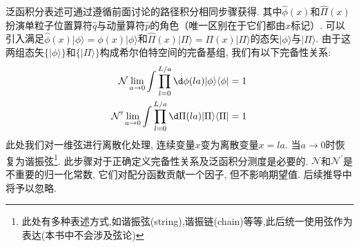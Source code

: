 泛函积分表述可通过遵循前面讨论的路径积分相同步骤获得. 其中$\hat{\phi}(x)$和$\hat{\Pi}(x)$扮演单粒子位置算符$\hat{q}$与动量算符$\hat{p}$的角色（唯一区别在于它们都由$x$标记）. 可以引入满足$\hat{\phi}(x)|\phi\rangle=\phi(x)|\phi\rangle$和$\hat{\Pi}(x)|\Pi\rangle=\Pi(x)|\Pi\rangle$的态矢$|\phi\rangle$与$|\Pi\rangle$. 由于这两组态矢$\{|\phi\rangle\}$和$\{|\Pi\rangle\}$构成希尔伯特空间的完备基组, 我们有以下完备性关系:
\begin{equation}
	\begin{aligned}\mathcal{N}\lim_{a\to0}\int\prod_{l=0}^{L/a}\d\phi(la)|\phi\rangle\langle\phi|&=1\\\mathcal{N}^{\prime}\lim_{a\to0}\int\prod_{l=0}^{L/a}\d\Pi(la)|\Pi\rangle\langle\Pi|&=1\end{aligned}
\end{equation}
此处我们对一维弦进行离散化处理, 连续变量$x$变为离散变量$x=la$. 当$a\to0$时恢复为谐振弦\footnote{此处有多种表述方式,如谐振弦(string),谐振链(chain)等等,此后统一使用弦作为表达(本书中不会涉及弦论)}. 此步骤对于正确定义完备性关系及泛函积分测度是必要的. $\mathcal{N}$和$\mathcal{N}^\prime$是不重要的归一化常数, 它们对配分函数贡献一个因子, 但不影响期望值. 后续推导中将予以忽略.


